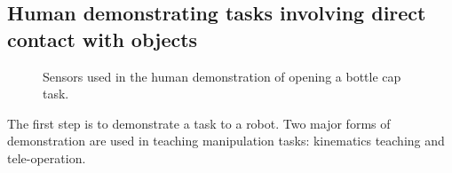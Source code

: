 \subsection{Human demonstrating tasks involving direct contact with objects}
\label{cha4:sec2:demo}


\begin{figure}
  \centering
    \caption{\scriptsize{Sensors used in the human demonstration of opening a bottle cap task.}}
  \label{fig:devices}
\end{figure}


The first step is to demonstrate a task to a robot. Two major forms of demonstration are used in teaching manipulation tasks: kinematics teaching and tele-operation.

